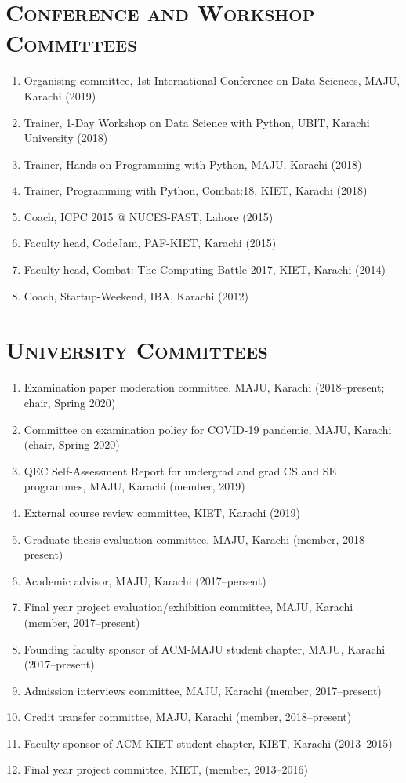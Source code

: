 \documentclass[a4paper, 10pt]{article}
\begin{document}
\section*{\normalfont\textsc{Conference and Workshop Committees}}
\begin{enumerate}
\itemsep-4pt
\item Organising committee, 1st International Conference on Data Sciences, MAJU, Karachi (2019)
\item Trainer, 1-Day Workshop on Data Science with Python, UBIT, Karachi University (2018)
\item  Trainer, Hands-on Programming with Python, MAJU, Karachi (2018)
\item  Trainer, Programming with Python, Combat:18, KIET, Karachi (2018)
\item  Coach, ICPC 2015 @ NUCES-FAST, Lahore (2015)
\item  Faculty head, CodeJam, PAF-KIET, Karachi (2015)
\item  Faculty head, Combat: The Computing Battle 2017, KIET, Karachi (2014)
\item  Coach, Startup-Weekend, IBA, Karachi (2012)
\end{enumerate}

\section*{\normalfont\textsc{University Committees}}
\begin{enumerate}
\itemsep-4pt 
\item Examination paper moderation committee, MAJU, Karachi (2018--present; chair, Spring 2020)
\item Committee on examination policy for COVID-19 pandemic, MAJU, Karachi (chair, Spring 2020)
\item QEC Self-Assessment Report for undergrad and grad CS and SE programmes, MAJU, Karachi (member, 2019)
\item External course review committee, KIET, Karachi (2019)
\item Graduate thesis evaluation committee, MAJU, Karachi (member, 2018--present)
\item Academic advisor, MAJU, Karachi (2017--persent)
\item Final year project evaluation/exhibition committee, MAJU, Karachi (member, 2017--present)
\item Founding faculty sponsor of ACM-MAJU student chapter, MAJU, Karachi (2017--present)
\item Admission interviews committee, MAJU, Karachi (member, 2017--present)
\item Credit transfer committee, MAJU, Karachi (member, 2018--present)
\item Faculty sponsor of ACM-KIET student chapter, KIET, Karachi (2013--2015)
\item Final year project committee, KIET, (member, 2013--2016)
\end{enumerate}
\end{document}
